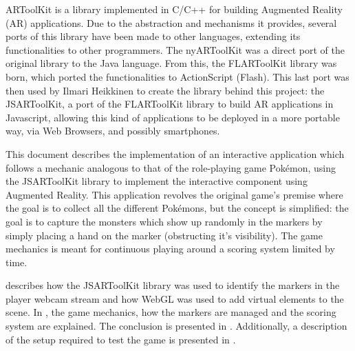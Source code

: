 \label{sec:intro}

ARToolKit is a library implemented in C/C++ for building Augmented Reality (AR) applications. Due to the abstraction and mechanisms it provides, several ports of this library have been made to other languages, extending its functionalities to other programmers. The nyARToolKit was a direct port of the original library to the Java language. From this, the FLARToolKit library was born, which ported the functionalities to ActionScript (Flash). This last port was then used by Ilmari Heikkinen to create the library behind this project: the JSARToolKit, a port of the FLARToolKit library to build AR applications in Javascript, allowing this kind of applications to be deployed in a more portable way, via Web Browsers, and possibly smartphones.

This document describes the implementation of an interactive application which follows a mechanic analogous to that of the role-playing game Pokémon\textsuperscript{\textregistered}, using the JSARToolKit library to implement the interactive component using Augmented Reality. This application revolves the original game's premise where the goal is to collect all the different Pokémons, but the concept is simplified: the goal is to capture the monsters which show up randomly in the markers by simply placing a hand on the marker (obstructing it's visibility). The game mechanics is meant for continuous playing around a scoring system limited by time.

 describes how the JSARToolKit library was used to identify the markers in the player webcam stream and how WebGL was used to add virtual elements to the scene. In , the game mechanics, how the markers are managed and the scoring system are explained. The conclusion is presented in . Additionally, a description of the setup required to test the game is presented in .
